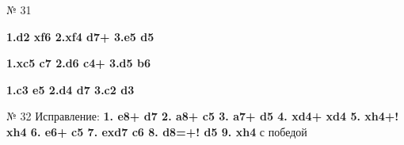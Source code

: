 № 31  \begin{enumerate*}[label={\alph*)}]
\item \textbf{1.\bishop{}d2 \knight{}xf6 2.\bishop{}xf4 \rook{}d7+ 3.\king{}e5 \rook{}d5\mate }
\item \textbf{1.\bishop{}xc5 \rook{}c7 2.\bishop{}d6 \rook{}c4+ 3.\king{}d5 \knight{}b6\mate }
\item \textbf{1.\king{}c3 \knight{}e5 2.\knight{}d4 \rook{}d7 3.\knight{}c2 \rook{}d3\mate }
\end{enumerate*}

№ 32 Исправление: \textbf{1. \queen{}e8+ \bishop{}d7 2. \queen{}a8+ \king{}c5 3. \queen{}a7+ \king{}d5 4. \queen{}xd4+ \king{}xd4 5. \rook{}xh4+! \rook{}xh4 6. e6+ \king{}c5 7. exd7 \king{}c6 8. d8=\knight{}+! \king{}d5 9. \bishop{}xh4 } с победой

